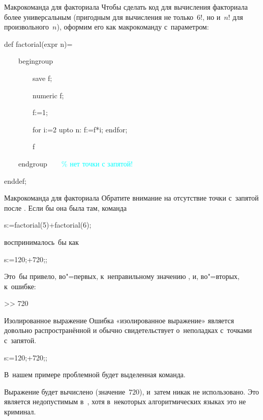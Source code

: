 \begin{frame}{Макрокоманда для факториала}
Чтобы сделать код для вычисления факториала более универсальным (пригодным для
вычисления не только~$6!$, но и~$n!$ для произвольного~$n$), оформим его как
макрокоманду с~параметром:
\begin{programlisting}
def factorial(expr \alert{n})=\par
~~~~begingroup\par
~~~~~~~~save f;\par
~~~~~~~~numeric f;\par
~~~~~~~~f:=1;\par
~~~~~~~~for i:=2 upto \alert{n}: f:=f*i; endfor;\par
~~~~~~~~f\par
~~~~endgroup~~~~\textcolor{cyan}{\% нет точки с запятой!}\par
enddef;
\end{programlisting}
\end{frame}


\begin{frame}{Макрокоманда для факториала}
Обратите внимание на отсутствие точки с~запятой после . Если
бы она была там, команда
\begin{programlisting}
s:=factorial(5)+factorial(6);
\end{programlisting}
воспринималось~бы как
\begin{programlisting}
s:=120\alert{;}+720\alert{;};
\end{programlisting}
Это~бы привело, во"=первых, к~неправильному значению , и,
во"=вторых, к~ошибке:
\begin{screen}
>> 720\par
{}%
%
\end{screen}
\end{frame}


\begin{frame}{Изолированное выражение}
Ошибка «изолированное выражение» является довольно распространённой и обычно
свидетельствует о~неполадках с~точками с~запятой.
\begin{programlisting}
s:=120;\alert{+720\alert;};
\end{programlisting}
В~нашем примере проблемной будет выделенная команда.

Выражение  будет вычислено (значение~$720$), и~затем никак не
использовано. Это является недопустимым в~, хотя в~некоторых
алгоритмических языках это не криминал.
\end{frame}


